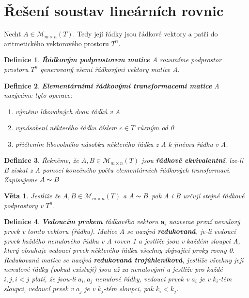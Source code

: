 \documentclass[12pt,a4paper]{article}
\newtheorem{definition}{Definice}
\newtheorem{sentence}{Věta}
\begin{document}
\section{Řešení soustav lineárních rovnic}
Nechť $A \in \mathscr{M}_{m \times n}(T)$. Tedy její řádky jsou řádkové vektory a patří do aritmetického vektorového prostoru $T^n$.

\begin{definition}
	\textbf{Řádkovým podprostorem matice} A rozumíme podprostor prostoru $T^n$ generovaný všemi řádkovými vektory matice A.
\end{definition}

\begin{definition}
	\textbf{Elementárnímí řádkovými transformacemi matice} A nazýváme tyto operace:
	\begin{enumerate}
		\item výměnu libovolných dvou řádků v A
		\item vynásobení některého řádku číslem $c \in T$ různým od 0
		\item přičtením libovolného násobku některého řádku z A k jinému řádku v A.
	\end{enumerate}
\end{definition}

\begin{definition}
	Řekněme, že $A,B \in \mathscr{M}_{m \times n}(T)$ jsou \textbf{řádkově ekvivalentní}, lze-li B získat z A pomocí konečného počtu elementárních řádkových transformací. Zapisujeme $A \thicksim B$
\end{definition}

\begin{sentence}
	Jestliže že $A,B \in \mathscr{M}_{m \times n}(T)$  a $A \thicksim B$ pak A i B určují stejné řádkové podprostory v $T^n$.
\end{sentence}

\begin{definition}
	\textbf{Vedoucím prvkem} řádkového vektoru $\textbf{a}_i$ nazveme první nenulový prvek v tomto vektoru (řádku). Matice A se nazývá \textbf{redukovaná}, je-li vedoucí prvek každého nenulového řádku v A roven 1 a jestliže jsou v každém sloupci A, který obsahuje vedoucí prvek některého řádku všechny zbývající prvky rovny 0. Redukovaná matice se nazývá \textbf{redukovaná trojúhleníková}, jestliže všechny její nenulové řádky (pokud existují) jsou až za nenulovými a jestliže pro každé $i,j, i < j$ platí, že jsou-li $a_i,a_j$ nenulové řádky, vedoucí prvek v $a_i$ je v $k_i$-tém sloupci, vedoucí prvek v $a_j$ je v $k_j$-tém sloupci, pak $k_i < k_j$. 
\end{definition}
\end{document}
